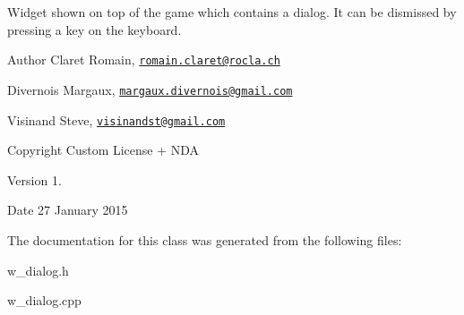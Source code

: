Widget shown on top of the game which contains a dialog. It can be dismissed by pressing a key on the keyboard. \begin{DoxyAuthor}{Author}
Claret Romain, \href{mailto:romain.claret@rocla.ch}{\tt romain.\+claret@rocla.\+ch} 

Divernois Margaux, \href{mailto:margaux.divernois@gmail.com}{\tt margaux.\+divernois@gmail.\+com} 

Visinand Steve, \href{mailto:visinandst@gmail.com}{\tt visinandst@gmail.\+com} 
\end{DoxyAuthor}
\begin{DoxyCopyright}{Copyright}
Custom License + N\+D\+A 
\end{DoxyCopyright}
\begin{DoxyVersion}{Version}
1. 
\end{DoxyVersion}
\begin{DoxyDate}{Date}
27 January 2015 
\end{DoxyDate}


The documentation for this class was generated from the following files\+:\begin{DoxyCompactItemize}
\item 
w\+\_\+dialog.\+h\item 
w\+\_\+dialog.\+cpp\end{DoxyCompactItemize}
